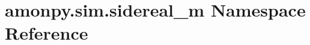 \hypertarget{namespaceamonpy_1_1sim_1_1sidereal__m}{\section{amonpy.\-sim.\-sidereal\-\_\-m Namespace Reference}
\label{namespaceamonpy_1_1sim_1_1sidereal__m}
}
